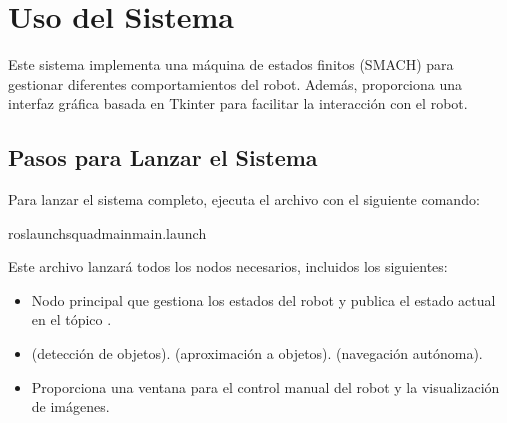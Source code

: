 \documentclass[a4paper,10pt,spanish]{sphinxmanual}
\begin{document}
\sphinxstepscope


\section{Uso del Sistema}
\label{\detokenize{uso:uso-del-sistema}}\label{\detokenize{uso::doc}}
\sphinxAtStartPar
Este sistema implementa una máquina de estados finitos (SMACH) para gestionar diferentes comportamientos del robot. Además, proporciona una interfaz gráfica basada en Tkinter para facilitar la interacción con el robot.


\subsection{Pasos para Lanzar el Sistema}
\label{\detokenize{uso:pasos-para-lanzar-el-sistema}}
\sphinxAtStartPar
Para lanzar el sistema completo, ejecuta el archivo  con el siguiente comando:

\begin{sphinxVerbatim}[commandchars=\\\{\}]
roslaunchsquad\PYGZus{}mainmain.launch
\end{sphinxVerbatim}

\sphinxAtStartPar
Este archivo lanzará todos los nodos necesarios, incluidos los siguientes:
\begin{itemize}
\item {} 
\sphinxAtStartPar
{}
Nodo principal que gestiona los estados del robot y publica el estado actual en el tópico .

\item {} 
\sphinxAtStartPar
{}
\sphinxhyphen{}  (detección de objetos).
\sphinxhyphen{}  (aproximación a objetos).
\sphinxhyphen{}  (navegación autónoma).

\item {} 
\sphinxAtStartPar
{}
Proporciona una ventana para el control manual del robot y la visualización de imágenes.

\end{itemize}
\end{document}
